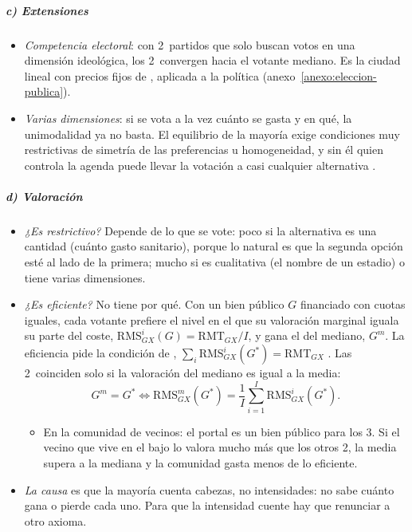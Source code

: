 \documentclass[11pt]{article}
\begin{document}
\subparagraph{c) Extensiones}

\begin{itemize}
\item \emph{Competencia electoral}: con 2~partidos que solo buscan votos en una dimensión ideológica, los 2~convergen hacia el votante mediano\nocite{Hotelling1929Stability,Downs1957Economic}. Es la ciudad lineal con precios fijos de  , aplicada a la política (anexo~\ref{anexo:eleccion-publica}).
\item \emph{Varias dimensiones}: si se vota a la vez cuánto se gasta y en qué, la unimodalidad ya no basta. El equilibrio de la mayoría exige condiciones muy restrictivas de simetría de las preferencias\nocite{Plott1967Notion} u homogeneidad\nocite{Kramer1973Class}, y sin él quien controla la agenda puede llevar la votación a casi cualquier alternativa\nocite{McKelvey1976Intransitivities} .
\end{itemize}

\subparagraph{d) Valoración}

\begin{itemize}
\item \emph{¿Es restrictivo?} Depende de lo que se vote: poco si la alternativa es una cantidad (cuánto gasto sanitario), porque lo natural es que la segunda opción esté al lado de la primera; mucho si es cualitativa (el nombre de un estadio) o tiene varias dimensiones.
\item \emph{¿Es eficiente?} No tiene por qué. Con un bien público $G$ financiado con cuotas iguales, cada votante prefiere el nivel en el que su valoración marginal iguala su parte del coste, $\mathrm{RMS}^i_{GX}(G)=\mathrm{RMT}_{GX}/I$, y gana el del mediano, $G^m$. La eficiencia pide la condición de , $\sum_i\mathrm{RMS}^i_{GX}(G^*)=\mathrm{RMT}_{GX}$ . Las 2~coinciden solo si la valoración del mediano es igual a la media\nocite{Bowen1943Interpretation}:
  $$G^m=G^*\iff \mathrm{RMS}^m_{GX}(G^*)=\frac{1}{I}\sum_{i=1}^{I}\mathrm{RMS}^i_{GX}(G^*).$$
  \begin{itemize}
  \item En la comunidad de vecinos: el portal es un bien público para los 3. Si el vecino que vive en el bajo lo valora mucho más que los otros 2, la media supera a la mediana y la comunidad gasta menos de lo eficiente.
  \end{itemize}
\item \emph{La causa} es que la mayoría cuenta cabezas, no intensidades: no sabe cuánto gana o pierde cada uno. Para que la intensidad cuente hay que renunciar a otro axioma.
\end{itemize}
\end{document}
